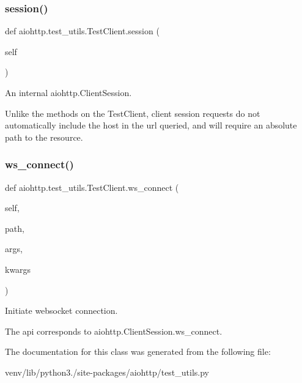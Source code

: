 \subsubsection{\texorpdfstring{session()}{session()}}
{\footnotesize\ttfamily def aiohttp.\+test\+\_\+utils.\+Test\+Client.\+session (\begin{DoxyParamCaption}\item[{}]{self }\end{DoxyParamCaption})}

\begin{DoxyVerb}An internal aiohttp.ClientSession.

Unlike the methods on the TestClient, client session requests
do not automatically include the host in the url queried, and
will require an absolute path to the resource.\end{DoxyVerb}
 \mbox{\label{classaiohttp_1_1test__utils_1_1_test_client_a91c8fd84f01420bf8593a450440bf52e}} 
\subsubsection{\texorpdfstring{ws\+\_\+connect()}{ws\_connect()}}
{\footnotesize\ttfamily def aiohttp.\+test\+\_\+utils.\+Test\+Client.\+ws\+\_\+connect (\begin{DoxyParamCaption}\item[{}]{self,  }\item[{}]{path,  }\item[{}]{args,  }\item[{}]{kwargs }\end{DoxyParamCaption})}

\begin{DoxyVerb}Initiate websocket connection.

The api corresponds to aiohttp.ClientSession.ws_connect.\end{DoxyVerb}
 

The documentation for this class was generated from the following file\+:\begin{DoxyCompactItemize}
\item 
venv/lib/python3./site-\/packages/aiohttp/test\+\_\+utils.\+py\end{DoxyCompactItemize}
